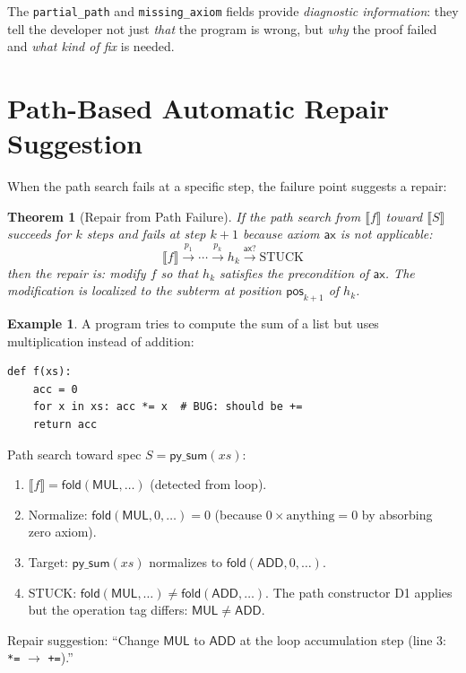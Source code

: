\documentclass[11pt,a4paper]{report}
\theoremstyle{definition}
\newtheorem{example}[definition]{Example}
\theoremstyle{plain}
\newtheorem{theorem}[definition]{Theorem}
\newcommand{\den}[1]{\llbracket #1 \rrbracket}
\newcommand{\fold}{\mathsf{fold}}
\begin{document}
The \texttt{partial\_path} and \texttt{missing\_axiom} fields provide
\emph{diagnostic information}: they tell the developer not just
\emph{that} the program is wrong, but \emph{why} the proof failed
and \emph{what kind of fix} is needed.

\section{Path-Based Automatic Repair Suggestion}

When the path search fails at a specific step, the failure point
suggests a repair:

\begin{theorem}[Repair from Path Failure]
\label{thm:repair-from-path}
If the path search from $\den{f}$ toward $\den{S}$ succeeds for
$k$ steps and fails at step $k+1$ because axiom $\mathsf{ax}$ is
not applicable:
\[
  \den{f} \xrightarrow{p_1} \cdots \xrightarrow{p_k} h_k
  \xrightarrow{\mathsf{ax}?} \text{STUCK}
\]
then the \emph{repair} is: modify $f$ so that $h_k$ satisfies the
precondition of $\mathsf{ax}$.  The modification is localized to
the subterm at position $\mathsf{pos}_{k+1}$ of $h_k$.
\end{theorem}

\begin{example}
A program tries to compute the sum of a list but uses multiplication
instead of addition:
\begin{lstlisting}
def f(xs):
    acc = 0
    for x in xs: acc *= x  # BUG: should be +=
    return acc
\end{lstlisting}

Path search toward spec $S = \mathsf{py\_sum}(xs)$:
\begin{enumerate}
  \item $\den{f} = \fold(\mathsf{MUL}, \ldots)$ (detected from loop).
  \item Normalize: $\fold(\mathsf{MUL}, 0, \ldots) = 0$ (because
    $0 \times \text{anything} = 0$ by absorbing zero axiom).
  \item Target: $\mathsf{py\_sum}(xs)$ normalizes to
    $\fold(\mathsf{ADD}, 0, \ldots)$.
  \item STUCK: $\fold(\mathsf{MUL}, \ldots) \neq \fold(\mathsf{ADD}, \ldots)$.
    The path constructor D1 applies but the operation tag differs:
    $\mathsf{MUL} \neq \mathsf{ADD}$.
\end{enumerate}

Repair suggestion: ``Change $\mathsf{MUL}$ to $\mathsf{ADD}$ at
the loop accumulation step (line 3: \texttt{*=} $\to$ \texttt{+=}).''
\end{example}
\end{document}
